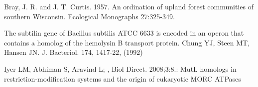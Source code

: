 \documentclass{article}
\begin{document}
\begin{thebibliography}{9}
	
	Bray, J. R. and J. T. Curtis. 1957. An ordination of upland forest communities of southern Wisconsin. Ecological Monographs 27:325-349.
	
	
	
	The subtilin gene of Bacillus subtilis ATCC 6633 is encoded in an operon that contains a homolog of the hemolysin B transport protein. Chung YJ, Steen MT, Hansen JN. J. Bacteriol. 174, 1417-22, (1992)
	
	 Iyer LM, Abhiman S, Aravind L; , Biol Direct. 2008;3:8.: MutL homologs in restriction-modification systems and the origin of eukaryotic MORC ATPases
	
	
\end{thebibliography}

 
\end{document}
